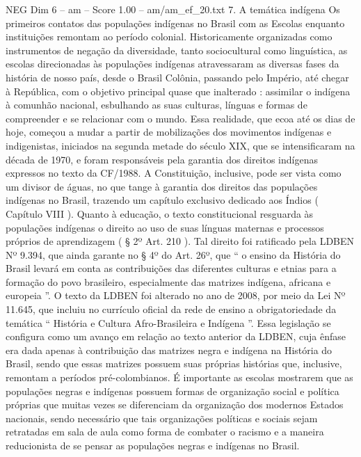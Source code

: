 \begin{textsample}{NEG Dim 6 – am – Score 1.00 – am/am\_ef\_20.txt}  \label{ex:f6_neg_025}
7.
A temática indígena Os primeiros contatos das populações indígenas no Brasil com as Escolas enquanto instituições remontam ao período colonial.
Historicamente organizadas como instrumentos de negação da diversidade, tanto sociocultural como linguística, as escolas direcionadas às populações indígenas atravessaram as diversas fases da história de nosso país, desde o Brasil Colônia, passando pelo Império, até chegar à República, com o objetivo principal quase que inalterado : assimilar o indígena à comunhão nacional, esbulhando as suas culturas, línguas e formas de compreender e se relacionar com o mundo.
Essa realidade, que ecoa até os dias de hoje, começou a mudar a partir de mobilizações dos movimentos indígenas e indigenistas, iniciados na segunda metade do século XIX, que se intensificaram na década de 1970, e foram responsáveis pela garantia dos direitos indígenas expressos no texto da CF/1988.
A Constituição, inclusive, pode ser vista como um divisor de águas, no que tange à garantia dos direitos das populações indígenas no Brasil, trazendo um capítulo exclusivo dedicado aos Índios ( Capítulo VIII ).
Quanto à educação, o texto constitucional resguarda às populações indígenas o direito ao uso de suas línguas maternas e processos próprios de aprendizagem ( § 2º Art. 210 ).
Tal direito foi ratificado pela LDBEN Nº 9.394, que ainda garante no § 4º do Art. 26º, que “ o ensino da História do Brasil levará em conta as contribuições das diferentes culturas e etnias para a formação do povo brasileiro, especialmente das matrizes indígena, africana e europeia ”.
O texto da LDBEN foi alterado no ano de 2008, por meio da Lei Nº 11.645, que incluiu no currículo oficial da rede de ensino a obrigatoriedade da temática “ História e Cultura Afro-Brasileira e Indígena ”.
Essa legislação se configura como um avanço em relação ao texto anterior da LDBEN, cuja ênfase era dada apenas à contribuição das matrizes negra e indígena na História do Brasil, sendo que essas matrizes possuem suas próprias histórias que, inclusive, remontam a períodos pré-colombianos.
É importante as escolas mostrarem que as populações negras e indígenas possuem formas de organização social e política próprias que muitas vezes se diferenciam da organização dos modernos Estados nacionais, sendo necessário que tais organizações políticas e sociais sejam retratadas em sala de aula como forma de combater o racismo e a maneira reducionista de se pensar as populações negras e indígenas no Brasil.

\end{textsample}
